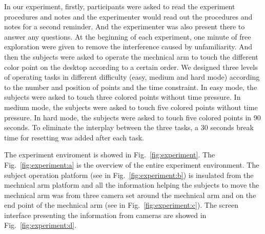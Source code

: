 \documentclass[runningheads,a4paper]{llncs}
\begin{document}
In our experiment, firstly, participants were asked to read the experiment
procedures and notes and the experimenter would read out the procedures and notes
for a second reminder. And the experimenter was also present there to answer any questions.
At the beginning of each experiment,
one minute of free exploration were given to remove the interference caused by unfamiliarity.
And then the subjects were asked to operate the mechnical arm to touch
the different color point on the desktop according to a certain order.
We designed three levels of operating tasks in different difficulty (easy, medium and hard mode)
according to the number and position of points and the time constraint. In easy
mode, the subjects were asked to touch three colored points without time pressure.
In medium mode, the subjects were asked to touch five colored points without
time pressure. In hard mode, the subjects were asked to touch five colored points
in 90 seconds. To eliminate the interplay between the three tasks,
a 30 seconds break time for resetting was added after each task.

The experiment enviroment is showed in Fig.~\ref{fig:experiment}.
The Fig.~\ref{fig:experiment:a} is the overview of the entire experiment environment.
The subject operation platform (see in Fig.~\ref{fig:experiment:b}) is insulated
from the mechnical arm platform and
all the information helping the subjects to move the mechnical arm was from three
camera set around the mechnical arm and on the end point of the mechnical arm
(see in Fig.~\ref{fig:experiment:c}). The screen interface presenting the information from
cameras are showed in Fig.~\ref{fig:experiment:d}.
\end{document}
